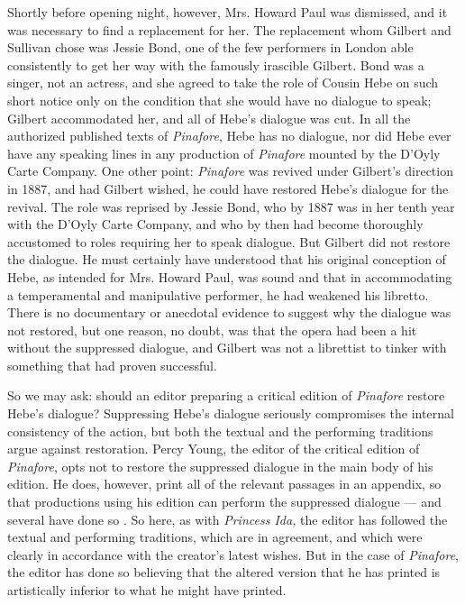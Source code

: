 \begin{paper}
Shortly before opening night, however, Mrs. Howard Paul was dismissed,
and it was necessary to find a replacement for her. The replacement whom
Gilbert and Sullivan chose was Jessie Bond, one of the few performers in
London able consistently to get her way with the famously irascible
Gilbert. Bond was a singer, not an actress, and she agreed to take the
role of Cousin Hebe on such short notice only on the condition that she
would have no dialogue to speak; Gilbert accommodated her, and all of
Hebe's dialogue was cut. In all the authorized published texts of
\emph{Pinafore}, Hebe has no dialogue, nor did Hebe ever have any
speaking lines in any production of \emph{Pinafore} mounted by the
D'Oyly Carte Company. One other point: \emph{Pinafore} was revived under
Gilbert's direction in 1887, and had Gilbert wished, he could have
restored Hebe's dialogue for the revival. The role was reprised by
Jessie Bond, who by 1887 was in her tenth year with the D'Oyly Carte
Company, and who by then had become thoroughly accustomed to roles
requiring her to speak dialogue. But Gilbert did not restore the
dialogue. He must certainly have understood that his original conception
of Hebe, as intended for Mrs. Howard Paul, was sound and that in
accommodating a temperamental and manipulative performer, he had
weakened his libretto. There is no documentary or anecdotal evidence to
suggest why the dialogue was not restored, but one reason, no doubt, was
that the opera had been a hit without the suppressed dialogue, and
Gilbert was not a librettist to tinker with something that had proven
successful.

So we may ask: should an editor preparing a critical edition of
\emph{Pinafore} restore Hebe's dialogue? Suppressing Hebe's dialogue
seriously compromises the internal consistency of the action, but both
the textual and the performing traditions argue against restoration.
Percy Young, the editor of the critical edition of \emph{Pinafore}, opts
not to restore the suppressed dialogue in the main body of his edition.
He does, however, print all of the relevant passages in an appendix, so
that productions using his edition can perform the suppressed
dialogue --- and several have done so \citep[B:173--77]{gilbert_h_2003}. So here, as with \emph{Princess Ida,} the editor
has followed the textual and performing traditions, which are in
agreement, and which were clearly in accordance with the creator's
latest wishes. But in the case of \emph{Pinafore}, the editor has done
so believing that the altered version that he has printed is
artistically inferior to what he might have printed.


\end{paper}
